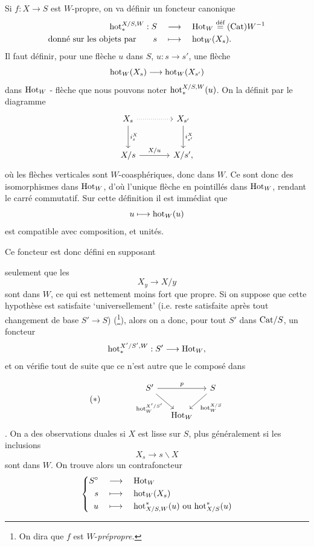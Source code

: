Si $f : X\longrightarrow S$ est $W$-propre, on va définir un foncteur canonique
\[
\begin{aligned}
\mathrm{hot}_*^{X/S,W} : S &\quad\longrightarrow\quad \mathrm{Hot}_W\overset{\text{déf}}{=}(\mathrm{Cat})W^{-1}\\
\text{donné sur les objets par}\qquad s &\quad\longmapsto\quad \mathrm{hot}_W(X_s).
\end{aligned}
\]
Il faut définir, pour une flèche $u$ dans $S$, $u : s\longrightarrow s'$, une flèche
\[
\mathrm{hot}_W(X_s)\longrightarrow\mathrm{hot}_W(X_{s'})
\]
dans $\mathrm{Hot}_W$ - flèche que nous pouvons noter $\mathrm{hot}_*^{X/S,W}(u)$. On la définit par le diagramme
\[
\begin{tikzcd}[row sep=large, column sep=large]
X_s \arrow[r, dotted] \arrow[d, "i_s^X"] & X_{s'} \arrow[d, "i_{s'}^X"] \\
X/s \arrow[r, "X/u"] & X/s',
\end{tikzcd}
\]
où les flèches verticales sont $W$-coasphériques, donc dans $W$. Ce sont donc des isomorphismes dans $\mathrm{Hot}_W$, d'où l'unique flèche en pointillés dans $\mathrm{Hot}_W$, rendant le carré commutatif. Sur cette définition il est immédiat que
\[
u\longmapsto\mathrm{hot}_W(u)
\]
est compatible avec composition, et unités.

Ce foncteur est donc défini en supposant

\leavevmode{}seulement que les
\[
X_y\longrightarrow X/y
\]
sont dans $W$, ce qui est nettement moins fort que propre. Si on suppose que cette hypothèse est satisfaite `universellement' (i.e. reste satisfaite après tout changement de base $S'\longrightarrow S$) (\footnote[45]{On dira que $f$ est $W$-\textit{prépropre.}}), alors on a donc, pour tout $S'$ dans $\mathrm{Cat}/S$, un foncteur
\[
\mathrm{hot}_*^{X'/S',W} : S'\longrightarrow\mathrm{Hot}_W,
\]
et on vérifie tout de suite que ce n'est autre que le composé dans

\[
(*)\qquad\qquad
\begin{tikzcd}[column sep=small]
S' \arrow[rr, "p"] \arrow[dr, "\hot_W^{X'/S'}"'] & & S \arrow[dl, "\hot_W^{X/S}"] \\
& \Hot_W &
\end{tikzcd}
\]
. On a des observations duales si $X$ est lisse sur $S$, plus généralement si les inclusions
\[
X_s\longrightarrow s\backslash X
\]
sont dans $W$. On trouve alors un contrafoncteur
\[
\left\{
\begin{aligned}
S^\circ &\quad\longrightarrow\quad \Hot_W\\
s &\quad\longmapsto\quad \hot_W(X_s)\\
u &\quad\longmapsto\quad \hot^*_{X/S,W}(u)\ \text{ou}\ \hot^*_{X/S}(u)
\end{aligned}
\right.
\]

